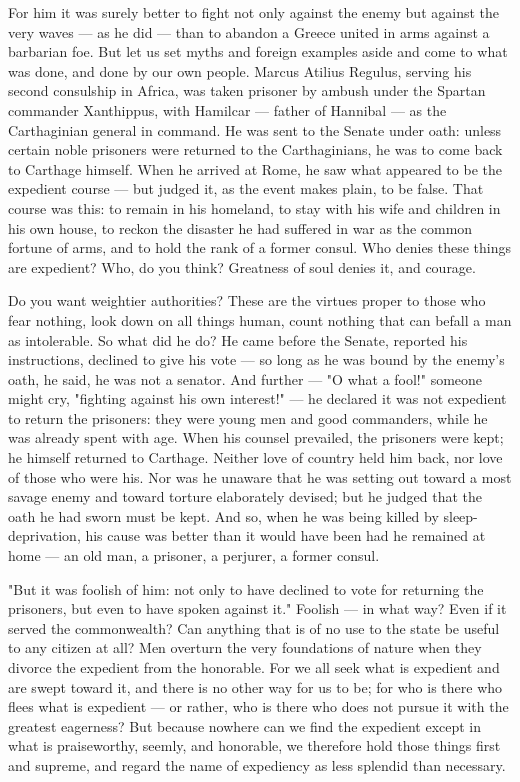  For him it was surely better to fight not only against the enemy but against the very waves — as he did — than to abandon a Greece united in arms against a barbarian foe. But let us set myths and foreign examples aside and come to what was done, and done by our own people. Marcus Atilius Regulus, serving his second consulship in Africa, was taken prisoner by ambush under the Spartan commander Xanthippus, with Hamilcar — father of Hannibal — as the Carthaginian general in command. He was sent to the Senate under oath: unless certain noble prisoners were returned to the Carthaginians, he was to come back to Carthage himself. When he arrived at Rome, he saw what appeared to be the expedient course — but judged it, as the event makes plain, to be false. That course was this: to remain in his homeland, to stay with his wife and children in his own house, to reckon the disaster he had suffered in war as the common fortune of arms, and to hold the rank of a former consul. Who denies these things are expedient? Who, do you think? Greatness of soul denies it, and courage.

 Do you want weightier authorities? These are the virtues proper to those who fear nothing, look down on all things human, count nothing that can befall a man as intolerable. So what did he do? He came before the Senate, reported his instructions, declined to give his vote — so long as he was bound by the enemy's oath, he said, he was not a senator. And further — "O what a fool!" someone might cry, "fighting against his own interest!" — he declared it was not expedient to return the prisoners: they were young men and good commanders, while he was already spent with age. When his counsel prevailed, the prisoners were kept; he himself returned to Carthage. Neither love of country held him back, nor love of those who were his. Nor was he unaware that he was setting out toward a most savage enemy and toward torture elaborately devised; but he judged that the oath he had sworn must be kept. And so, when he was being killed by sleep-deprivation, his cause was better than it would have been had he remained at home — an old man, a prisoner, a perjurer, a former consul.

 "But it was foolish of him: not only to have declined to vote for returning the prisoners, but even to have spoken against it." Foolish — in what way? Even if it served the commonwealth? Can anything that is of no use to the state be useful to any citizen at all? Men overturn the very foundations of nature when they divorce the expedient from the honorable. For we all seek what is expedient and are swept toward it, and there is no other way for us to be; for who is there who flees what is expedient — or rather, who is there who does not pursue it with the greatest eagerness? But because nowhere can we find the expedient except in what is praiseworthy, seemly, and honorable, we therefore hold those things first and supreme, and regard the name of expediency as less splendid than necessary.

